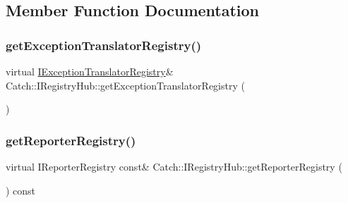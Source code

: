 \subsection{Member Function Documentation}
\hypertarget{struct_catch_1_1_i_registry_hub_a3606988da110c016c5af3ae63454eb78}{}\label{struct_catch_1_1_i_registry_hub_a3606988da110c016c5af3ae63454eb78} 
\subsubsection{\texorpdfstring{get\+Exception\+Translator\+Registry()}{getExceptionTranslatorRegistry()}}
{\footnotesize\ttfamily virtual \hyperlink{struct_catch_1_1_i_exception_translator_registry}{I\+Exception\+Translator\+Registry}\& Catch\+::\+I\+Registry\+Hub\+::get\+Exception\+Translator\+Registry (\begin{DoxyParamCaption}{ }\end{DoxyParamCaption})\hspace{0.3cm}{\ttfamily [pure virtual]}}

\hypertarget{struct_catch_1_1_i_registry_hub_a55534563f7ecf7e20ec1e37285ebe54d}{}\label{struct_catch_1_1_i_registry_hub_a55534563f7ecf7e20ec1e37285ebe54d} 
\subsubsection{\texorpdfstring{get\+Reporter\+Registry()}{getReporterRegistry()}}
{\footnotesize\ttfamily virtual I\+Reporter\+Registry const\& Catch\+::\+I\+Registry\+Hub\+::get\+Reporter\+Registry (\begin{DoxyParamCaption}{ }\end{DoxyParamCaption}) const\hspace{0.3cm}{\ttfamily [pure virtual]}}

\hypertarget{struct_catch_1_1_i_registry_hub_af4f6255f0c0f8f1f179fa9d7d4843076}{}\label{struct_catch_1_1_i_registry_hub_af4f6255f0c0f8f1f179fa9d7d4843076} 
